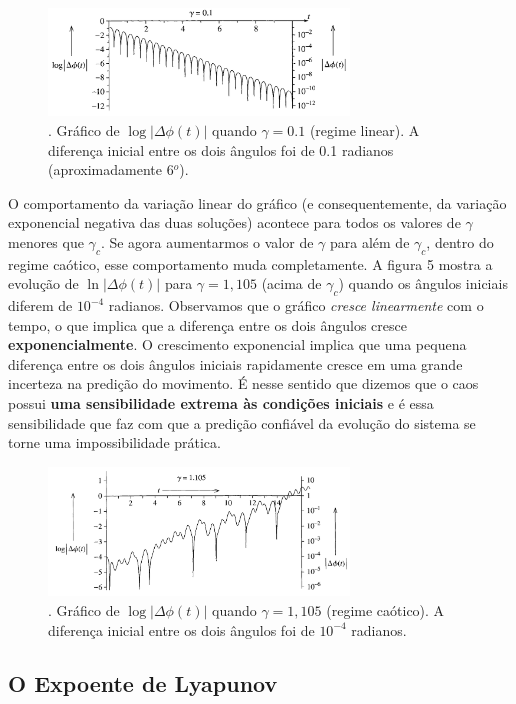 \documentclass{article}
\begin{document}
\begin{figure}[h]
\centering
\includegraphics[width=8cm]{pend2.png}
\captionsetup{labelsep=none}
\caption{. Gráfico de $\log{|\Delta\phi(t)|}$ quando $\gamma = 0.1$ (regime linear). A diferença inicial entre os dois ângulos foi de 0.1 radianos (aproximadamente 6$^o$). }
\end{figure}

O comportamento da variação linear do gráfico (e consequentemente, da variação exponencial negativa das duas soluções) acontece para todos os valores de $\gamma$ menores que $\gamma_c$. Se agora aumentarmos o valor de $\gamma$ para além de $\gamma_c$, dentro do regime caótico, esse comportamento muda completamente. A figura 5 mostra a evolução de $\ln{|\Delta\phi (t)|}$ para $\gamma = 1,105$ (acima de $\gamma_c$) quando os ângulos iniciais diferem de $10^{-4}$ radianos. Observamos que o gráfico \textit{cresce linearmente} com o tempo, o que implica que a diferença entre os dois ângulos cresce \textbf{exponencialmente}. O crescimento exponencial implica que uma pequena diferença entre os dois ângulos iniciais rapidamente cresce em uma grande incerteza na predição do movimento. É nesse sentido que dizemos que o caos possui \textbf{uma sensibilidade extrema às condições iniciais} e é essa sensibilidade que faz com que a predição confiável da evolução do sistema se torne uma impossibilidade prática.

\begin{figure}[h]
\centering
\includegraphics[width=8cm]{pend3.png}
\captionsetup{labelsep=none}
\caption{. Gráfico de $\log{|\Delta\phi(t)|}$ quando $\gamma = 1,105$ (regime caótico). A diferença inicial entre os dois ângulos foi de $10^{-4}$ radianos. }
\end{figure}

\subsection{O Expoente de Lyapunov}
\end{document}
